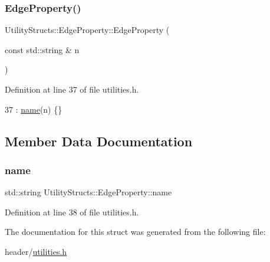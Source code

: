 \subsubsection{\texorpdfstring{Edge\+Property()}{EdgeProperty()}}
{\footnotesize\ttfamily Utility\+Structs\+::\+Edge\+Property\+::\+Edge\+Property (\begin{DoxyParamCaption}\item[{const std\+::string \&}]{n }\end{DoxyParamCaption})\hspace{0.3cm}{\ttfamily [inline]}}



Definition at line 37 of file utilities.\+h.


\begin{DoxyCode}
37 : \hyperlink{struct_utility_structs_1_1_edge_property_a0701d898f719b1efbf795d80f503de81}{name}(n) \{\}
\end{DoxyCode}


\subsection{Member Data Documentation}
\mbox{\label{struct_utility_structs_1_1_edge_property_a0701d898f719b1efbf795d80f503de81}} 
\subsubsection{\texorpdfstring{name}{name}}
{\footnotesize\ttfamily std\+::string Utility\+Structs\+::\+Edge\+Property\+::name}



Definition at line 38 of file utilities.\+h.



The documentation for this struct was generated from the following file\+:\begin{DoxyCompactItemize}
\item 
header/\hyperlink{utilities_8h}{utilities.\+h}\end{DoxyCompactItemize}
